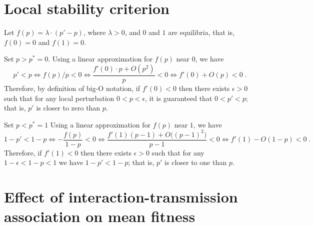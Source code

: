 \documentclass[12pt]{extarticle}
\begin{document}
\begin{appendices}
\linespread{1.25}
\renewcommand{\theequation}{\thesection\arabic{equation}}


\section{Local stability criterion} \label{sec:appendixA}


Let $f(p)=\lambda \cdot (p'-p)$, where $\lambda>0$, and $0$ and $1$ are equilibria, that is, $f(0)=0$ and $f(1)=0$.

Set $p>p^*=0$.
Using a linear approximation for $f(p)$ near $0$, we have
\begin{equation}
p' < p \Leftrightarrow 
f(p)/p < 0 \Leftrightarrow 
\frac{f'(0) \cdot p + O(p^2)}{p} < 0 \Leftrightarrow 
f'(0) + O(p) < 0 \;.
\end{equation}
Therefore, by definition of big-O notation, if $f'(0)<0$ then there exists $\epsilon>0$ such that for any local perturbation $0<p<\epsilon$, it is guaranteed that $0<p'<p$; that is, $p'$ is closer to zero than $p$.

Set $p<p^*=1$
Using a linear approximation for $f(p)$ near $1$, we have
\begin{equation}
1-p' < 1-p  \Leftrightarrow 
-\frac{f(p)}{1-p} < 0 \Leftrightarrow 
\frac{f'(1)(p-1) + O\big((p-1)^2\big)}{p-1} < 0 \Leftrightarrow 
f'(1) - O(1-p) < 0 \;.
\end{equation}
Therefore, if $f'(1)<0$ then there exists $\epsilon>0$ such that for any $1-\epsilon<1-p<1$ we have $1-p'<1-p$; that is, $p'$ is closer to one than $p$.


\section{Effect of interaction-transmission association on mean fitness} \label{sec:appendixB}


\end{appendices}
\end{document}
